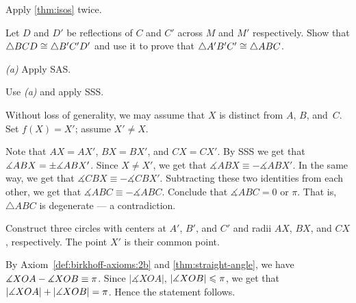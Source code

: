 \setcounter{eqtn}{0}

Apply \ref{thm:isos} twice.

Let $D$ and $D'$ be reflections of
$C$ and $C'$ across $M$ and $M'$ respectively.
Show that $\triangle BCD\cong \triangle B'C'D'$ and use it to prove that $\triangle A' B' C'\cong\triangle A B C$.

 \textit{(a)} Apply SAS.

 Use \textit{(a)} and apply SSS.

Without loss of generality, we may assume that $X$ is distinct from $A$, $B$, and~$C$.
Set $f(X)=X'$; assume $X'\ne X$.

Note that $AX=AX'$, $BX=BX'$, and $CX=CX'$.
By SSS we get that $\measuredangle ABX=\pm\measuredangle ABX'$.
Since $X\ne X'$, we get that
$\measuredangle ABX\equiv - \measuredangle ABX'$.
In the same way, we get that 
$\measuredangle CBX\equiv - \measuredangle CBX'$.
Subtracting these two identities from each other, we get that
$\measuredangle ABC\equiv -\measuredangle ABC$.
Conclude that $\measuredangle ABC=0$ or $\pi$.
That is, $\triangle ABC$ is degenerate --- a contradiction. 

 Construct three circles with centers at $A'$, $B'$, and $C'$ and radii $AX$, $BX$, and $CX$, respectively.
The point $X'$ is their common point.


\setcounter{eqtn}{0}


By Axiom~\ref{def:birkhoff-axioms:2b} and \ref{thm:straight-angle}, we have
$\measuredangle XOA-\measuredangle XOB\equiv\pi$.
Since $|\measuredangle XOA|$, $|\measuredangle XOB|\leqslant \pi$, we get that
$|\measuredangle XOA|+|\measuredangle XOB|=\pi$.
Hence the statement follows. 

